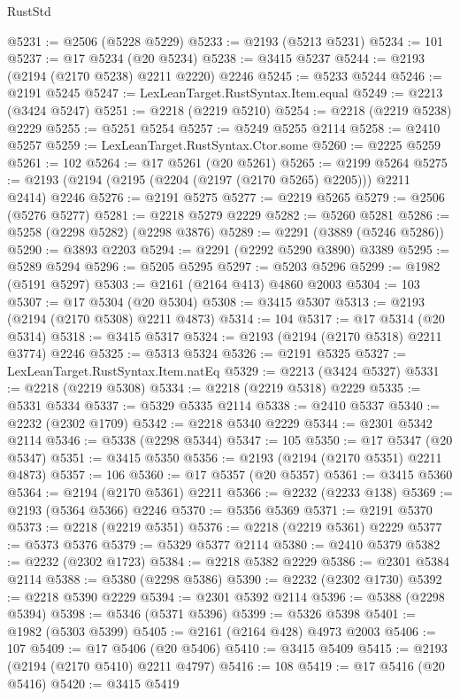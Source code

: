 \begin{lexlean}{RustStd}
\begin{coremodule}
@5231 := @2506 (@5228 @5229)
@5233 := @2193 (@5213 @5231)
@5234 := 101
@5237 := @17 @5234 (@20 @5234)
@5238 := @3415 @5237
@5244 := @2193 (@2194 (@2170 @5238) @2211 @2220) @2246
@5245 := @5233 @5244
@5246 := @2191 @5245
@5247 := LexLeanTarget.RustSyntax.Item.equal
@5249 := @2213 (@3424 @5247)
@5251 := @2218 (@2219 @5210)
@5254 := @2218 (@2219 @5238) @2229
@5255 := @5251 @5254
@5257 := @5249 @5255 @2114
@5258 := @2410 @5257
@5259 := LexLeanTarget.RustSyntax.Ctor.some
@5260 := @2225 @5259
@5261 := 102
@5264 := @17 @5261 (@20 @5261)
@5265 := @2199 @5264
@5275 := @2193 (@2194 (@2195 (@2204 (@2197 (@2170 @5265) @2205))) @2211 @2414) @2246
@5276 := @2191 @5275
@5277 := @2219 @5265
@5279 := @2506 (@5276 @5277)
@5281 := @2218 @5279 @2229
@5282 := @5260 @5281
@5286 := @5258 (@2298 @5282) (@2298 @3876)
@5289 := @2291 (@3889 (@5246 @5286))
@5290 := @3893 @2203
@5294 := @2291 (@2292 @5290 @3890) @3389
@5295 := @5289 @5294
@5296 := @5205 @5295
@5297 := @5203 @5296
@5299 := @1982 (@5191 @5297)
@5303 := @2161 (@2164 @413) @4860 @2003
@5304 := 103
@5307 := @17 @5304 (@20 @5304)
@5308 := @3415 @5307
@5313 := @2193 (@2194 (@2170 @5308) @2211 @4873)
@5314 := 104
@5317 := @17 @5314 (@20 @5314)
@5318 := @3415 @5317
@5324 := @2193 (@2194 (@2170 @5318) @2211 @3774) @2246
@5325 := @5313 @5324
@5326 := @2191 @5325
@5327 := LexLeanTarget.RustSyntax.Item.natEq
@5329 := @2213 (@3424 @5327)
@5331 := @2218 (@2219 @5308)
@5334 := @2218 (@2219 @5318) @2229
@5335 := @5331 @5334
@5337 := @5329 @5335 @2114
@5338 := @2410 @5337
@5340 := @2232 (@2302 @1709)
@5342 := @2218 @5340 @2229
@5344 := @2301 @5342 @2114
@5346 := @5338 (@2298 @5344)
@5347 := 105
@5350 := @17 @5347 (@20 @5347)
@5351 := @3415 @5350
@5356 := @2193 (@2194 (@2170 @5351) @2211 @4873)
@5357 := 106
@5360 := @17 @5357 (@20 @5357)
@5361 := @3415 @5360
@5364 := @2194 (@2170 @5361) @2211
@5366 := @2232 (@2233 @138)
@5369 := @2193 (@5364 @5366) @2246
@5370 := @5356 @5369
@5371 := @2191 @5370
@5373 := @2218 (@2219 @5351)
@5376 := @2218 (@2219 @5361) @2229
@5377 := @5373 @5376
@5379 := @5329 @5377 @2114
@5380 := @2410 @5379
@5382 := @2232 (@2302 @1723)
@5384 := @2218 @5382 @2229
@5386 := @2301 @5384 @2114
@5388 := @5380 (@2298 @5386)
@5390 := @2232 (@2302 @1730)
@5392 := @2218 @5390 @2229
@5394 := @2301 @5392 @2114
@5396 := @5388 (@2298 @5394)
@5398 := @5346 (@5371 @5396)
@5399 := @5326 @5398
@5401 := @1982 (@5303 @5399)
@5405 := @2161 (@2164 @428) @4973 @2003
@5406 := 107
@5409 := @17 @5406 (@20 @5406)
@5410 := @3415 @5409
@5415 := @2193 (@2194 (@2170 @5410) @2211 @4797)
@5416 := 108
@5419 := @17 @5416 (@20 @5416)
@5420 := @3415 @5419

\end{coremodule}
\end{lexlean}
